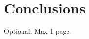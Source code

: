 \documentclass[12pt,a4paper,openright,twoside]{book}
\begin{document}
\chapter{Conclusions}%
\label{chap:conclusions}




\backmatter





\begin{acknowledgements} %
Optional. Max 1 page.
\end{acknowledgements}
\end{document}
